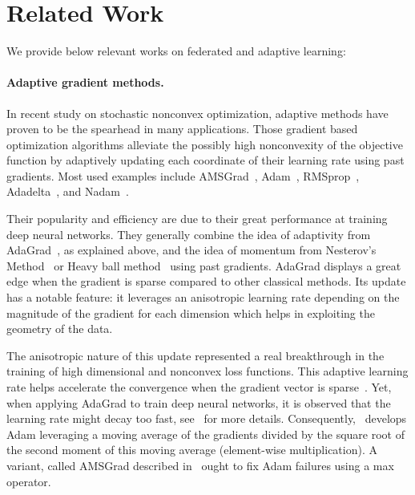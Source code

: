 \documentclass[11pt]{article}
\begin{document}
\section{Related Work}\label{sec:related}

We provide below relevant works on federated and adaptive learning:
\paragraph{Adaptive gradient methods.}
In recent study on stochastic nonconvex optimization, adaptive methods have proven to be the spearhead in many applications.
Those gradient based optimization algorithms alleviate the possibly high nonconvexity of the objective function by adaptively updating each coordinate of their learning rate using past gradients. Most used examples include AMSGrad~\cite{RKK18}, Adam~\cite{KB15}, RMSprop~\cite{TH12}, Adadelta~\cite{Z12}, and Nadam~\cite{D16}.

Their popularity and efficiency are due to their great performance at training deep neural networks.
They generally combine the idea of adaptivity from AdaGrad~\cite{DHS11,MS10}, as explained above, and the idea of momentum from Nesterov's Method~\cite{N04} or Heavy ball method~\cite{P64} using past gradients.
AdaGrad displays a great edge when the gradient is sparse compared to other classical methods.
Its update has a notable feature: it leverages an anisotropic learning rate depending on the magnitude of the gradient for each dimension which helps in exploiting the geometry of the data. 

The anisotropic nature of this update represented a real breakthrough in the training of high dimensional and nonconvex loss functions.
This adaptive learning rate helps accelerate the convergence when the gradient vector is sparse~\cite{DHS11}. Yet, when applying AdaGrad to train deep neural networks, it is observed that the learning rate might decay too fast, see~\cite{KB15} for more details.
Consequently,~\cite{KB15} develops Adam leveraging a moving average of the gradients divided by the square root of the second moment of this moving average (element-wise multiplication).
A variant, called AMSGrad described in~\cite{RKK18} ought to fix Adam failures using a max operator.
\end{document}
